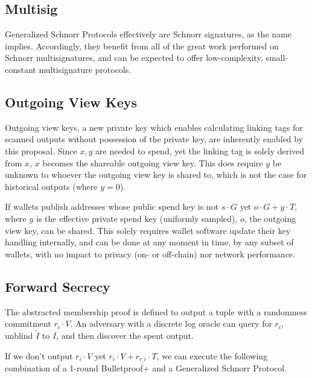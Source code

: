 \documentclass[]{article}
\begin{document}
\subsection{Multisig}

Generalized Schnorr Protocols effectively are Schnorr signatures, as the name implies. Accordingly, they benefit from all of the great work performed on Schnorr multisignatures, and can be expected to offer low-complexity, small-constant multisignature protocols.

\subsection{Outgoing View Keys}

Outgoing view keys, a new private key which enables calculating linking tags for scanned outputs without possession of the private key, are inherently enabled by this proposal. Since $x, y$ are needed to spend, yet the linking tag is solely derived from $x$, $x$ becomes the shareable outgoing view key. This does require $y$ be unknown to whoever the outgoing view key is shared to, which is not the case for historical outputs (where $y = 0$).

If wallets publish addresses whose public spend key is not $s \cdot G$ yet $o \cdot G + y \cdot T$, where $y$ is the effective private spend key (uniformly sampled), $o$, the outgoing view key, can be shared. This solely requires wallet software update their key handling internally, and can be done at any moment in time, by any subset of wallets, with no impact to privacy (on- or off-chain) nor network performance.

\subsection{Forward Secrecy}

The abstracted membership proof is defined to output a tuple with a randomness commitment $r_i \cdot V$. An adversary with a discrete log oracle can query for $r_i$, unblind $\tilde{I}$ to $I$, and then discover the spent output.

If we don't output $r_i \cdot V$ yet $r_i \cdot V + r_{r\_i} \cdot T$, we can execute the following combination of a 1-round Bulletproof+ and a Generalized Schnorr Protocol.
\end{document}
